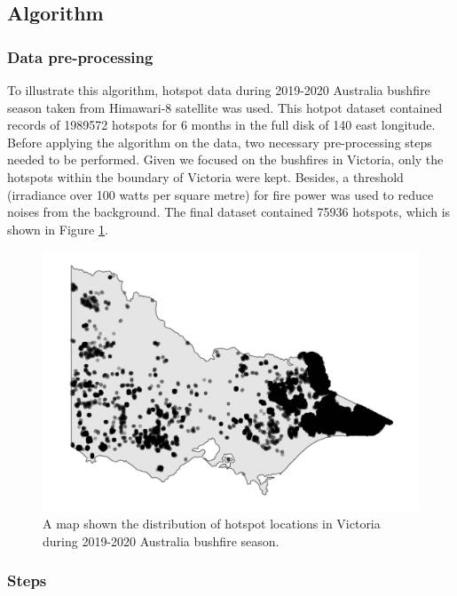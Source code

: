 \hypertarget{algorithm}{%
\subsection{Algorithm}\label{algorithm}}

\hypertarget{data-pre-processing}{%
\subsubsection{Data pre-processing}\label{data-pre-processing}}

To illustrate this algorithm, hotspot data during 2019-2020 Australia
bushfire season taken from Himawari-8 satellite \citep{jaxa} was used.
This hotpot dataset contained records of 1989572 hotspots for 6 months
in the full disk of 140 \textdegree east longitude. Before applying the
algorithm on the data, two necessary pre-processing steps needed to be
performed. Given we focused on the bushfires in Victoria, only the
hotspots within the boundary of Victoria were kept. Besides, a threshold
(irradiance over 100 watts per square metre) for fire power was used to
reduce noises from the background. The final dataset contained 75936
hotspots, which is shown in Figure \ref{fig:hotspots}.

\begin{Schunk}
\begin{figure}
\includegraphics[width=0.8\linewidth]{figures/before_clustering} \caption[A map shown the distribution of hotspot locations in Victoria during 2019-2020 Australia bushfire season]{A map shown the distribution of hotspot locations in Victoria during 2019-2020 Australia bushfire season.}\label{fig:hotspots}
\end{figure}
\end{Schunk}

\hypertarget{steps}{%
\subsubsection{Steps}\label{steps}}

